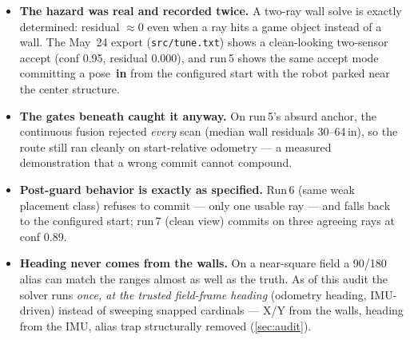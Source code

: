 \documentclass[11pt]{article}
\begin{document}
\vspace{0.3em}
\begin{itemize}
  \item \textbf{The hazard was real and recorded twice.} A two-ray wall solve is
  exactly determined: residual $\approx 0$ even when a ray hits a game object
  instead of a wall. The May~24 export (\texttt{src/tune.txt}) shows a clean-looking
  two-sensor accept (conf 0.95, residual 0.000), and run\,5 shows the same accept
  mode committing a pose \textbf{\RunFiveCommitErr\,in} from the configured start
  with the robot parked near the center structure.
  \item \textbf{The gates beneath caught it anyway.} On run\,5's absurd anchor, the
  continuous fusion rejected \emph{every} scan (median wall residuals
  \numrange{30}{64}\,in), so the route still ran cleanly on start-relative
  odometry --- a measured demonstration that a wrong commit cannot compound.
  \item \textbf{Post-guard behavior is exactly as specified.} Run\,6 (same weak
  placement class) refuses to commit --- only one usable ray --- and falls back to the
  configured start; run\,7 (clean view) commits on three agreeing rays at conf 0.89.
  \item \textbf{Heading never comes from the walls.} On a near-square field a
  90/180\textdegree{} alias can match the ranges almost as well as the truth. As of
  this audit the solver runs \emph{once, at the trusted field-frame heading}
  (odometry heading, IMU-driven) instead of sweeping snapped cardinals --- X/Y from
  the walls, heading from the IMU, alias trap structurally removed
  (\autoref{sec:audit}).
\end{itemize}

\end{document}
